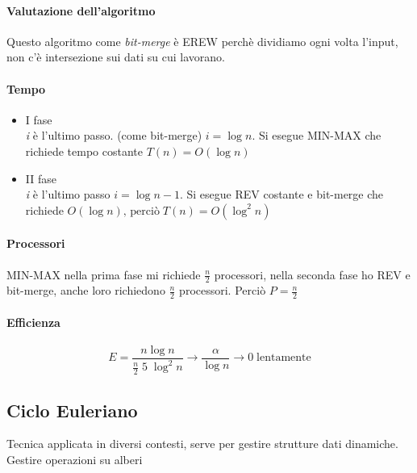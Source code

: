 \paragraph{Valutazione dell'algoritmo}
Questo algoritmo come \textit{bit-merge} è EREW perchè dividiamo ogni volta l'input, non c'è intersezione sui dati su cui lavorano. 

\paragraph{Tempo}
\begin{itemize}
    \item I fase\\
    \textit{i} è l'ultimo passo. (come bit-merge) $i = \log n$. Si esegue MIN-MAX che richiede tempo costante $T(n) = O (\log n)$
    \item II fase\\
    \textit{i} è l'ultimo passo $i = \log n-1$. Si esegue REV costante e bit-merge che richiede $O (\log n) \text{, perciò} \; T(n) = O(\log^2 n)$
\end{itemize}

\paragraph{Processori}
MIN-MAX nella prima fase mi richiede $\frac{n}{2}$ processori, nella seconda fase ho REV e bit-merge, anche loro richiedono $\frac{n}{2}$ processori. Perciò $P = \frac{n}{2}$


\paragraph{Efficienza}
$$E = \frac{n \log n}{\frac{n}{2}\;5\;\log^2n} \rightarrow \frac{\alpha}{\log n} \rightarrow 0 \;\text{lentamente}$$

\newpage


\subsection{Ciclo Euleriano}
Tecnica applicata in diversi contesti, serve per gestire strutture dati dinamiche. Gestire operazioni su alberi

